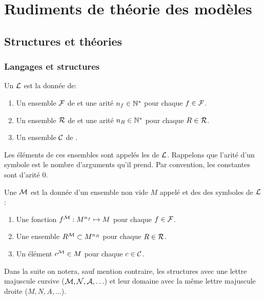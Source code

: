 \chapter{Rudiments de théorie des modèles}

\section{Structures et théories}

\subsection{Langages et structures}

\begin{defi}[Langage]
Un  $\mathcal{L}$ est la donnée de:
    \begin{enumerate}[label= (\roman*)]
        \item Un ensemble $\mathcal{F}$ de  et une arité $n_f \in \mathbb{N}^{*}$ pour chaque $f \in \mathcal{F}$.
        \item Un ensemble $\mathcal{R}$ de  et une arité $n_R \in \mathbb{N}^{*}$ pour
        chaque $R \in \mathcal{R}$.
        \item Un ensemble $\mathcal{C}$ de .
    \end{enumerate}
Les éléments de ces ensembles sont appelés les  de $\mathcal{L}$.
Rappelons que l'arité d'un symbole est le nombre d'arguments qu'il prend.
Par convention, les constantes sont d'arité 0.
\end{defi}

\begin{defi}[Structure]
Une  $\mathcal{M}$ est la donnée d'un ensemble non vide $M$ appelé
 et des  des symboles de $\mathcal{L}$:
    \begin{enumerate}[label= (\roman*)]
        \item Une fonction $f^{\mathcal{M}}:M^{n_f} \mapsto M$ pour chaque $f\in \mathcal{F}$.
        \item Une ensemble $R^{\mathcal{M}} \subset M^{n_R}$ pour chaque $R \in \mathcal{R}$.
        \item Un élément $c^{\mathcal{M}} \in M$ pour chaque $c \in \mathcal{C}$.
    \end{enumerate}
\end{defi}

\begin{nota}
Dans la suite on notera, sauf mention contraire, les structures avec une lettre
majuscule cursive ($\mathcal{M},\mathcal{N},\mathcal{A}, \ldots$) et leur domaine avec la même lettre
majuscule droite ($M,N,A, \ldots$).
\end{nota}

